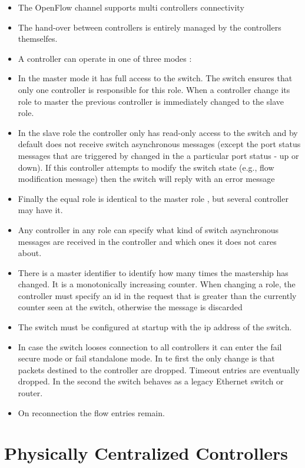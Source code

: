 \begin{itemize}
\begin{itemize}
\item The OpenFlow channel supports multi controllers connectivity
\item The hand-over between controllers is entirely managed by the controllers themselfes.
\item A controller can operate in one of three modes : 
\item In the master mode it has full access to the switch. The switch ensures that only one controller is responsible for this role.  When a controller change its role to master the previous controller is immediately changed to the slave role. 
\item In the slave role the controller only has read-only access to the switch and by default does not receive switch asynchronous messages (except the port status messages that are triggered by changed in the a particular port status - up or down). If this controller attempts to modify the switch state (e.g., flow  modification message) then the switch will reply with an error message
\item Finally the equal role is identical to the master role , but several controller may have it. 
\item Any controller in any role can specify what kind of switch asynchronous messages are received in the controller and which ones it does not cares about. 
\item There is a master identifier to identify how many times the mastership has changed. It is a monotonically increasing counter. When changing a role, the controller must specify an id in the request that is greater than the currently counter seen at the switch, otherwise the message is discarded

\item The switch must be configured at startup with the ip address of the switch. 
\item In case the switch looses connection to all controllers it can enter the fail secure mode or fail standalone mode. In te first the only change is that packets destined to the controller are dropped. Timeout entries are eventually dropped. In the second the switch behaves as a legacy Ethernet switch or router. 
\item On reconnection the flow entries remain. 

\end{itemize}
\section{Physically Centralized  Controllers}
\glsresetall
\label{sec:background:centralized}



\end{itemize}
